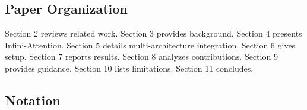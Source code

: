 \subsection{Paper Organization}

Section 2 reviews related work. Section 3 provides background. Section 4 
presents Infini-Attention. Section 5 details multi-architecture integration. 
Section 6 gives setup. Section 7 reports results. Section 8 analyzes 
contributions. Section 9 provides guidance. Section 10 lists limitations. 
Section 11 concludes.



\subsection{Notation}
